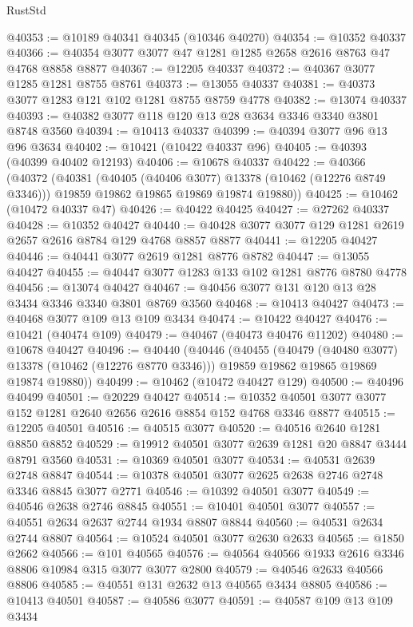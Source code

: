 \begin{lexlean}{RustStd}
\begin{coremodule}
@40353 := @10189 @40341 @40345 (@10346 @40270)
@40354 := @10352 @40337
@40366 := @40354 @3077 @3077 @47 @1281 @1285 @2658 @2616 @8763 @47 @4768 @8858 @8877
@40367 := @12205 @40337
@40372 := @40367 @3077 @1285 @1281 @8755 @8761
@40373 := @13055 @40337
@40381 := @40373 @3077 @1283 @121 @102 @1281 @8755 @8759 @4778
@40382 := @13074 @40337
@40393 := @40382 @3077 @118 @120 @13 @28 @3634 @3346 @3340 @3801 @8748 @3560
@40394 := @10413 @40337
@40399 := @40394 @3077 @96 @13 @96 @3634
@40402 := @10421 (@10422 @40337 @96)
@40405 := @40393 (@40399 @40402 @12193)
@40406 := @10678 @40337
@40422 := @40366
    (@40372
      (@40381
        (@40405 (@40406 @3077) @13378 (@10462 (@12276 @8749 @3346)))
        @19859
        @19862
        @19865
        @19869
        @19874
        @19880))
@40425 := @10462 (@10472 @40337 @47)
@40426 := @40422 @40425
@40427 := @27262 @40337
@40428 := @10352 @40427
@40440 := @40428 @3077 @3077 @129 @1281 @2619 @2657 @2616 @8784 @129 @4768 @8857 @8877
@40441 := @12205 @40427
@40446 := @40441 @3077 @2619 @1281 @8776 @8782
@40447 := @13055 @40427
@40455 := @40447 @3077 @1283 @133 @102 @1281 @8776 @8780 @4778
@40456 := @13074 @40427
@40467 := @40456 @3077 @131 @120 @13 @28 @3434 @3346 @3340 @3801 @8769 @3560
@40468 := @10413 @40427
@40473 := @40468 @3077 @109 @13 @109 @3434
@40474 := @10422 @40427
@40476 := @10421 (@40474 @109)
@40479 := @40467 (@40473 @40476 @11202)
@40480 := @10678 @40427
@40496 := @40440
    (@40446
      (@40455
        (@40479 (@40480 @3077) @13378 (@10462 (@12276 @8770 @3346)))
        @19859
        @19862
        @19865
        @19869
        @19874
        @19880))
@40499 := @10462 (@10472 @40427 @129)
@40500 := @40496 @40499
@40501 := @20229 @40427
@40514 := @10352 @40501 @3077 @3077 @152 @1281 @2640 @2656 @2616 @8854 @152 @4768 @3346 @8877
@40515 := @12205 @40501
@40516 := @40515 @3077
@40520 := @40516 @2640 @1281 @8850 @8852
@40529 := @19912 @40501 @3077 @2639 @1281 @20 @8847 @3444 @8791 @3560
@40531 := @10369 @40501 @3077
@40534 := @40531 @2639 @2748 @8847
@40544 := @10378 @40501 @3077 @2625 @2638 @2746 @2748 @3346 @8845 @3077 @2771
@40546 := @10392 @40501 @3077
@40549 := @40546 @2638 @2746 @8845
@40551 := @10401 @40501 @3077
@40557 := @40551 @2634 @2637 @2744 @1934 @8807 @8844
@40560 := @40531 @2634 @2744 @8807
@40564 := @10524 @40501 @3077 @2630 @2633
@40565 := @1850 @2662
@40566 := @101 @40565
@40576 := @40564 @40566 @1933 @2616 @3346 @8806 @10984 @315 @3077 @3077 @2800
@40579 := @40546 @2633 @40566 @8806
@40585 := @40551 @131 @2632 @13 @40565 @3434 @8805
@40586 := @10413 @40501
@40587 := @40586 @3077
@40591 := @40587 @109 @13 @109 @3434

\end{coremodule}
\end{lexlean}
